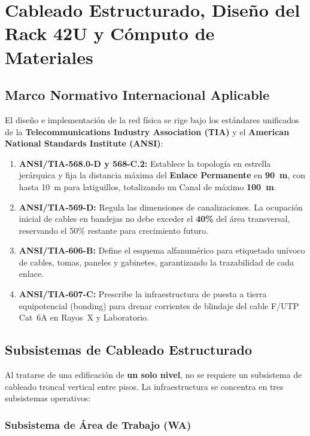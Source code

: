 \chapter{Cableado Estructurado, Diseño del Rack 42U y Cómputo de Materiales}

\section{Marco Normativo Internacional Aplicable}

El diseño e implementación de la red física se rige bajo los estándares unificados de la \textbf{Telecommunications Industry Association (TIA)} y el \textbf{American National Standards Institute (ANSI)}:

\begin{enumerate}[leftmargin=*, label=\arabic*.]
    \item \textbf{ANSI/TIA-568.0-D y 568-C.2:} Establece la topología en estrella jerárquica y fija la distancia máxima del \textbf{Enlace Permanente} en \textbf{90~m}, con hasta 10~m para latiguillos, totalizando un Canal de máximo \textbf{100~m}.
    \item \textbf{ANSI/TIA-569-D:} Regula las dimensiones de canalizaciones. La ocupación inicial de cables en bandejas no debe exceder el \textbf{40\%} del área transversal, reservando el 50\% restante para crecimiento futuro.
    \item \textbf{ANSI/TIA-606-B:} Define el esquema alfanumérico para etiquetado unívoco de cables, tomas, paneles y gabinetes, garantizando la trazabilidad de cada enlace.
    \item \textbf{ANSI/TIA-607-C:} Prescribe la infraestructura de puesta a tierra equipotencial (bonding) para drenar corrientes de blindaje del cable F/UTP Cat~6A en Rayos~X y Laboratorio.
\end{enumerate}

\section{Subsistemas de Cableado Estructurado}

Al tratarse de una edificación de \textbf{un solo nivel}, no se requiere un subsistema de cableado troncal vertical entre pisos. La infraestructura se concentra en tres subsistemas operativos:

\subsection{Subsistema de Área de Trabajo (WA)}

